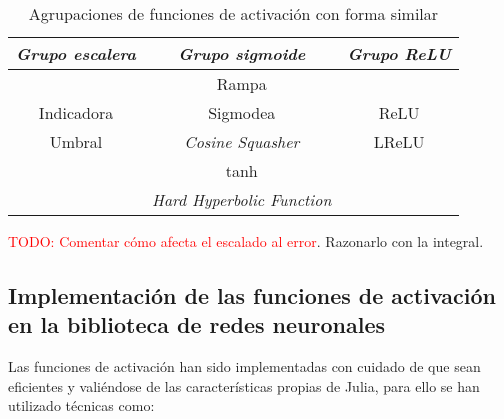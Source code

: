 \begin{table}[H] 
    \centering  
    \begin{tabular}{| c | c | c | }
        \hline
        \textit{Grupo escalera} & \textit{Grupo sigmoide} & \textit{Grupo ReLU} \\
        \hline
       &  Rampa &  \\
       Indicadora & Sigmodea & ReLU\\
       Umbral & \textit{Cosine Squasher}& LReLU\\
        & tanh & \\
        & \textit{Hard Hyperbolic Function}& \\
\hline
    \end{tabular}
    \caption{Agrupaciones de funciones de activación con forma similar}  
    \label{table:Clases-equivalencia-activation-function}
\end{table}

\textcolor{red}{TODO: Comentar cómo afecta el escalado al error}. Razonarlo con la integral.

\subsection{ Implementación de las funciones de activación en la biblioteca de redes neuronales} 

Las funciones de activación han sido implementadas con cuidado de que sean eficientes 
y valiéndose de las características propias de Julia, para ello se han utilizado técnicas como: 

\setlength{\marginparwidth}{\bigMarginSize}


